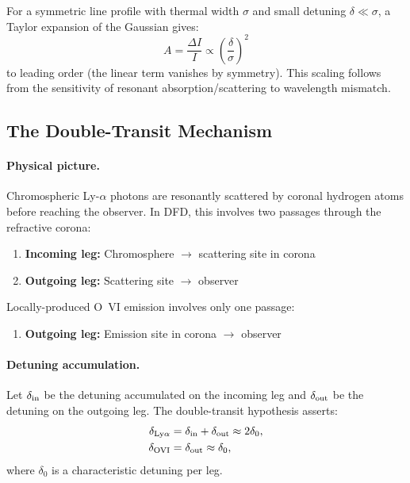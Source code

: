 For a symmetric line profile with thermal width $\sigma$ and small detuning 
$\delta \ll \sigma$, a Taylor expansion of the Gaussian gives:
\begin{equation}
A = \frac{\Delta I}{I} \propto \left(\frac{\delta}{\sigma}\right)^2
\end{equation}
to leading order (the linear term vanishes by symmetry). This scaling follows 
from the sensitivity of resonant absorption/scattering to wavelength mismatch.

\subsection{The Double-Transit Mechanism}

\paragraph{Physical picture.}
Chromospheric Ly-$\alpha$ photons are resonantly scattered by coronal hydrogen 
atoms before reaching the observer. In DFD, this involves two passages through 
the refractive corona:
\begin{enumerate}[nosep]
\item \textbf{Incoming leg:} Chromosphere $\to$ scattering site in corona
\item \textbf{Outgoing leg:} Scattering site $\to$ observer
\end{enumerate}

Locally-produced O~VI emission involves only one passage:
\begin{enumerate}[nosep]
\item \textbf{Outgoing leg:} Emission site in corona $\to$ observer
\end{enumerate}

\paragraph{Detuning accumulation.}
Let $\delta_{\rm in}$ be the detuning accumulated on the incoming leg and 
$\delta_{\rm out}$ be the detuning on the outgoing leg. The double-transit 
hypothesis asserts:
\begin{align}
\delta_{\rm Ly\alpha} &= \delta_{\rm in} + \delta_{\rm out} \approx 2\delta_0, \\
\delta_{\rm OVI} &= \delta_{\rm out} \approx \delta_0,
\end{align}
where $\delta_0$ is a characteristic detuning per leg.

